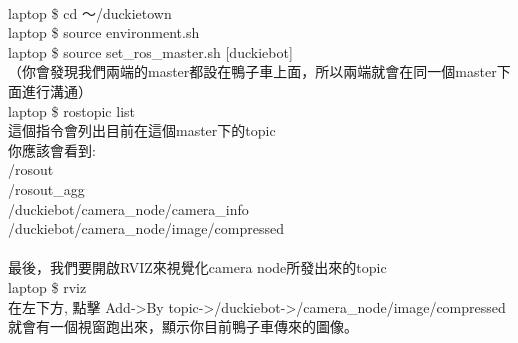 \documentclass{article}
\begin{document}
\\laptop \$ cd ～/duckietown
\\laptop \$ source environment.sh
\\laptop \$ source set\_ros\_master.sh [duckiebot]
\\（你會發現我們兩端的master都設在鴨子車上面，所以兩端就會在同一個master下面進行溝通）
\\laptop \$ rostopic list
\\這個指令會列出目前在這個master下的topic
\\你應該會看到:
\\/rosout
\\/rosout\_agg
\\/duckiebot/camera\_node/camera\_info
\\/duckiebot/camera\_node/image/compressed
\\
\\最後，我們要開啟RVIZ來視覺化camera node所發出來的topic
\\laptop \$ rviz 
\\在左下方, 點擊 Add->By topic->/duckiebot->/camera\_node/image/compressed
\\就會有一個視窗跑出來，顯示你目前鴨子車傳來的圖像。
\end{document}
